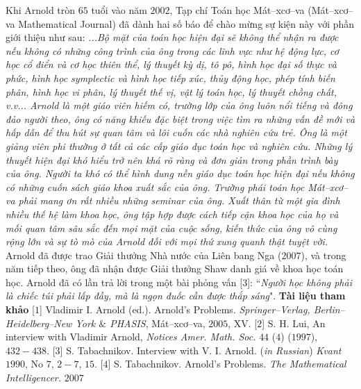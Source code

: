 \begin{multicols}{2}
\begin{figure}[H]
	\end{figure}
	Khi Arnold tròn $65$ tuổi vào năm $2002$, Tạp chí Toán học Mát--xcơ--va (Mát--xcơ--va Mathematical Journal) đã dành hai số báo để chào mừng sự kiện này với phần giới thiệu như sau: 
	\vskip 0.1cm
	\textit{...Bộ mặt của toán học hiện đại sẽ không thể nhận ra được nếu không có những công trình của ông trong các lĩnh vực như hệ động lực, cơ học cổ điển và cơ học thiên thể, lý thuyết  kỳ dị, tô pô, hình học đại số thực và phức, hình học symplectic và hình học tiếp xúc, thủy động học, phép tính biến phân, hình học vi phân, lý thuyết thế vị, vật lý toán học, lý thuyết chồng chất, v.v...
	\vskip 0.1cm
	Arnold là một giáo viên hiếm có, trường lớp của ông luôn nổi tiếng và đông đảo người theo, ông có năng khiếu đặc biệt trong việc tìm ra những vấn đề mới và  hấp dẫn để thu hút sự quan tâm và lôi cuốn các nhà nghiên cứu trẻ. Ông là một giảng viên phi thường ở tất cả các cấp giáo dục toán học và nghiên cứu. Những lý thuyết hiện đại khó hiểu trở nên khá rõ ràng và đơn giản trong phần trình bày của ông. Người ta khó có thể hình dung nền giáo dục toán học hiện đại nếu không có những cuốn sách giáo khoa xuất sắc của ông. Trường phái toán học Mát--xcơ--va phải mang ơn rất nhiều những seminar của ông.
	\vskip 0.1cm
	Xuất thân từ một gia đình nhiều thế hệ làm khoa học, ông tập hợp được cách tiếp cận khoa học của họ và mối quan tâm sâu sắc đến mọi mặt của cuộc sống, kiến thức của ông vô cùng rộng lớn và sự tò mò của Arnold đối với mọi thứ xung quanh thật tuyệt vời.}
	\vskip 0.1cm
	Arnold đã được trao Giải thưởng Nhà nước của Liên bang Nga ($2007$), và trong năm tiếp theo, ông đã nhận được Giải thưởng Shaw danh giá về khoa học toán học.
	\vskip 0.1cm
	Arnold đã có lần trả lời trong một bài phỏng vấn [$3$]: ``\textit{Người học không phải là chiếc túi phải lấp đầy, mà là ngọn đuốc cần được thắp sáng}".
	\vskip 0.1cm
	\textbf{\color{quantoan}Tài liệu tham khảo}
	\vskip 0.1cm
	[$1$] Vladimir I. Arnold (ed.). Arnold's Problems. \textit{Springer--Verlag, Berlin--Heidelberg--New York $\&$ PHASIS}, Mát--xcơ--va, $2005$, XV.
	\vskip 0.1cm
	[$2$]	S. H. Lui, An interview with Vladimir Arnold, \textit{Notices Amer. Math. Soc.} $44$ ($4$) ($1997$), $432-438$.
	\vskip 0.1cm
	[$3$]	S. Tabachnikov. Interview with V. I. Arnold. (\textit{in Russian}) \textit{Kvant} $1990$, No $7$, $2-7$, $15$.
	\vskip 0.1cm
	[$4$]	S. Tabachnikov. Arnold's Problems. \textit{The Mathematical Intelligencer.} $2007$
\end{multicols}
\newpage
\begingroup
